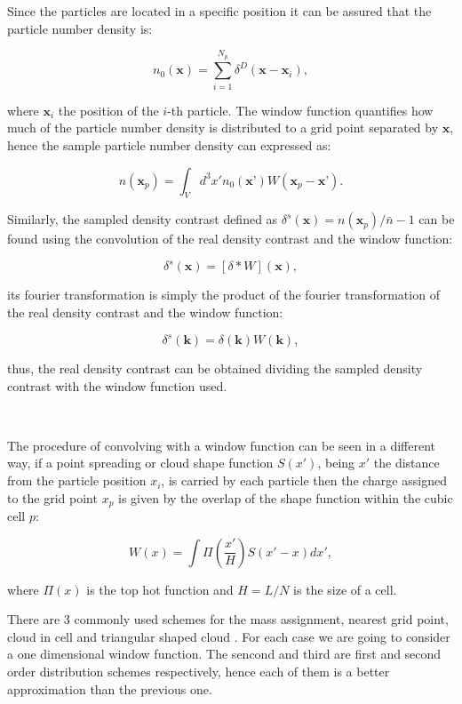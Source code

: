 Since the particles are located in a specific position it can be assured that
the particle number density is: 

\[n_0(\textbf{x}) = \sum_{i=1}^{N_{p}} \delta^D ( \textbf{x} - \textbf{x}_i ),\]

where $\textbf{x}_i$ the position of the $i$-th particle. The window function 
quantifies how much of the particle number density is distributed to a grid point 
separated by $\textbf{x}$, hence the sample particle number density can expressed as: 

\[n(\textbf{x}_p) = \int_V d^3 x' n_0(\textbf{x'}) W(\textbf{x}_p-\textbf{x'}).\]

Similarly, the sampled density contrast defined as $\delta^s(\textbf{x})=n(\textbf{x}_p)/\bar{n}-1$ 
can be found using the convolution of the real density contrast and the window function: 

\begin{equation}
\delta^s(\textbf{x}) = [\delta*W](\textbf{x}),
\label{df_conv}
\end{equation}

its fourier transformation is simply the product of the fourier transformation of the real 
density contrast and the window function: 

\begin{equation}
\delta^s(\textbf{k}) = \delta(\textbf{k})W(\textbf{k}),
\label{df_four}
\end{equation}

thus, the real density contrast can be obtained dividing the sampled density contrast with
the window function used. 

\

The procedure of convolving with a window function can be seen in a different way, if a 
point spreading or cloud shape function $S(x')$, being $x'$ the distance from the particle
position $x_i$, is carried by each particle then the charge assigned to the grid point $x_p$ 
is given by the overlap of the shape function within the cubic cell $p$:

\[W(x)=\int \Pi \left(\frac{x'}{H} \right) S(x'-x)dx', \]

where $\Pi(x)$ is the top hot function and $H=L/N$ is the size of a cell. 

There are 3 commonly used schemes for the mass assignment, nearest grid point, cloud
in cell and triangular shaped cloud \cite{hockney}. For each case we are going to 
consider a one dimensional window function. The sencond and third are first 
and second order distribution schemes respectively, hence each of them is a better 
approximation than the previous one. 

